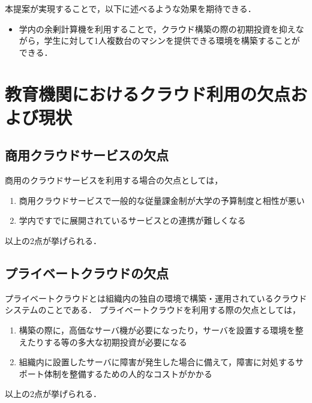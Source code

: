 \documentclass[11pt,a4paper]{jsarticle}
\begin{document}
\par 本提案が実現することで，以下に述べるような効果を期待できる．
\begin{itemize}
	\item 学内の余剰計算機を利用することで，クラウド構築の際の初期投資を抑えながら，学生に対して1人複数台のマシンを提供できる環境を構築することができる．
\end{itemize}


\section{教育機関におけるクラウド利用の欠点および現状}
\subsection{商用クラウドサービスの欠点}
商用のクラウドサービスを利用する場合の欠点としては，
\begin{enumerate}
	\item 商用クラウドサービスで一般的な従量課金制が大学の予算制度と相性が悪い
	\item 学内ですでに展開されているサービスとの連携が難しくなる
\end{enumerate}
以上の2点が挙げられる．
\subsection{プライベートクラウドの欠点}
プライベートクラウドとは組織内の独自の環境で構築・運用されているクラウドシステムのことである．
プライベートクラウドを利用する際の欠点としては，
\begin{enumerate}
	\item 構築の際に，高価なサーバ機が必要になったり，サーバを設置する環境を整えたりする等の多大な初期投資が必要になる
	\item 組織内に設置したサーバに障害が発生した場合に備えて，障害に対処するサポート体制を整備するための人的なコストがかかる
\end{enumerate}
以上の2点が挙げられる．
\end{document}
